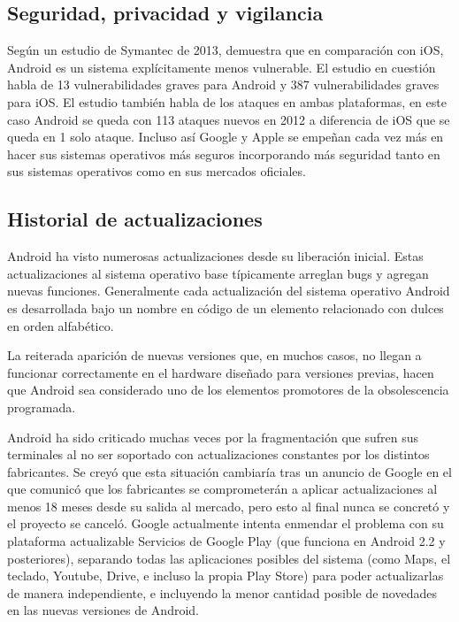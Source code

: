 \documentclass{bmcart}
\begin{document}
\newpage
\subsection*{Seguridad, privacidad y vigilancia}

Según un estudio de Symantec de 2013, demuestra que en comparación con iOS, Android es un sistema explícitamente menos vulnerable. El estudio en cuestión habla de 13 vulnerabilidades graves para Android y 387 vulnerabilidades graves para iOS. El estudio también habla de los ataques en ambas plataformas, en este caso Android se queda con 113 ataques nuevos en 2012 a diferencia de iOS que se queda en 1 solo ataque. Incluso así Google y Apple se empeñan cada vez más en hacer sus sistemas operativos más seguros incorporando más seguridad tanto en sus sistemas operativos como en sus mercados oficiales.

\subsection*{Historial de actualizaciones}

Android ha visto numerosas actualizaciones desde su liberación inicial. Estas actualizaciones al sistema operativo base típicamente arreglan bugs y agregan nuevas funciones. Generalmente cada actualización del sistema operativo Android es desarrollada bajo un nombre en código de un elemento relacionado con dulces en orden alfabético.\newline

La reiterada aparición de nuevas versiones que, en muchos casos, no llegan a funcionar correctamente en el hardware diseñado para versiones previas, hacen que Android sea considerado uno de los elementos promotores de la obsolescencia programada.\newline

Android ha sido criticado muchas veces por la fragmentación que sufren sus terminales al no ser soportado con actualizaciones constantes por los distintos fabricantes. Se creyó que esta situación cambiaría tras un anuncio de Google en el que comunicó que los fabricantes se comprometerán a aplicar actualizaciones al menos 18 meses desde su salida al mercado, pero esto al final nunca se concretó y el proyecto se canceló. Google actualmente intenta enmendar el problema con su plataforma actualizable Servicios de Google Play (que funciona en Android 2.2 y posteriores), separando todas las aplicaciones posibles del sistema (como Maps, el teclado, Youtube, Drive, e incluso la propia Play Store) para poder actualizarlas de manera independiente, e incluyendo la menor cantidad posible de novedades en las nuevas versiones de Android.
\end{document}
